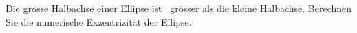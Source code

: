 Die grosse Halbachse einer Ellipse ist \pabO\ grösser als die kleine Halbachse. Berechnen Sie die numerische Exzentrizität der Ellipse.
